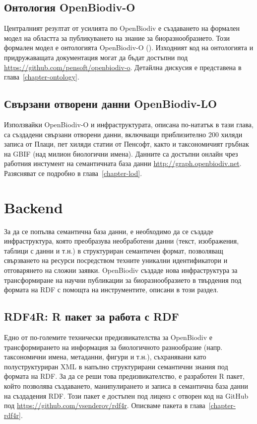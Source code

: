 \subsection{Онтология OpenBiodiv-O}

Централният резултат от усилията по OpenBiodiv е създаването на формален модел на областта за публикуването на знание за биоразнообразието. Този формален модел е онтологията OpenBiodiv-O (\cite{senderov_openbiodiv_2017}). Изходният код на онтологията и придружаващата документация могат да бъдат достъпни под \url{https://github.com/pensoft/openbiodiv-o}. Детайлна дискусия е представена в глава~\ref{chapter-ontology}.

\subsection{Свързани отворени данни OpenBiodiv-LO }

Използвайки OpenBiodiv-O и инфраструктурата, описана по-нататък в тази глава, са създадени свързани отворени данни, включващи приблизително 200 хиляди записа от Плаци, пет хиляди статии от Пенсофт, както и таксономичият гръбнак на GBIF (над милион биологични имена). Данните са достъпни онлайн чрез работния инстумент на семантичната база данни \url{http://graph.openbiodiv.net}. Разясняват се подробно в глава~\ref {chapter-lod}.

\section{Backend}

За да се попълва семантична база данни, е необходимо да се създаде инфраструктура, която преобразува необработени данни (текст, изображения, таблици с данни и т.н.) в структуриран семантичен формат, позволяващ свързването на ресурси посредством техните уникални идентификатори и отговарянето на сложни заявки. OpenBiodiv създаде нова инфраструктура за трансформиране на научни публикации за биоразнообразието в твърдения под формата на RDF с помощта на инструментите, описани в този раздел.

\subsection{RDF4R: R пакет за работа с RDF}

Едно от по-големите технически предизвикателства за OpenBiodiv е трансформирането на информация за биологичното разнообразие (напр. таксономични имена, метаданни, фигури и т.н.), съхранявани като полуструктуриран XML в напълно структурирани семантични знания под формата на RDF. За да се реши това предизвикателство, е разработен R пакет, който позволява създаването, манипулирането и записа в семантична база данни на създадения RDF. Този пакет е достъпен под лиценз с отворен код на GitHub под \url{https://github.com/vsenderov/rdf4r}. Описваме пакета в глава~\ref{chapter-rdf4r}.

